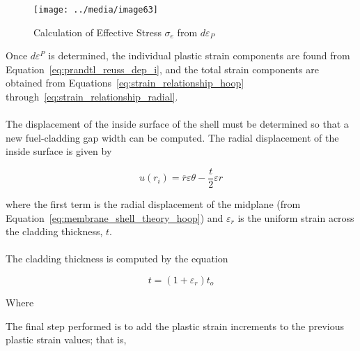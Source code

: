\begin{figure}
    \texttt{[image: ../media/image63]}
    \caption{Calculation of Effective Stress $\sigma_{e}$ from $d\varepsilon_{P}$}
    \label{fig:calculation_effective_stress_from_dep}
\end{figure}

Once $d\varepsilon^{P}$ is determined, the individual plastic strain
components are found from Equation~\ref{eq:prandtl_reuss_dep_i}, and the
total strain components are obtained from Equations~\ref{eq:strain_relationship_hoop}
through~\ref{eq:strain_relationship_radial}.
\\
\\
The displacement of the inside surface of the shell must be determined so that a new fuel-cladding
gap width can be computed. The radial displacement of the inside surface is given by

\begin{equation}
    \label{eq:shell_inside_surface_radial_displacement}
    u\left(r_{i}\right) = \overline{r} \varepsilon{\theta}  - \frac{t}{2} \varepsilon{r}
\end{equation}

where the first term is the radial displacement of the midplane (from
Equation~\ref{eq:membrane_shell_theory_hoop}) and $\varepsilon_{r}$ is the uniform strain across the
cladding thickness, $t$.
\\
\\
The cladding thickness is computed by the equation

\begin{equation}
    \label{eq:shell_cladding_thickness}
    t = \left(1 + \varepsilon_{r}\right)t_{o}
\end{equation}

Where

The final step performed is to add the plastic strain increments to the previous plastic strain
values; that is,

